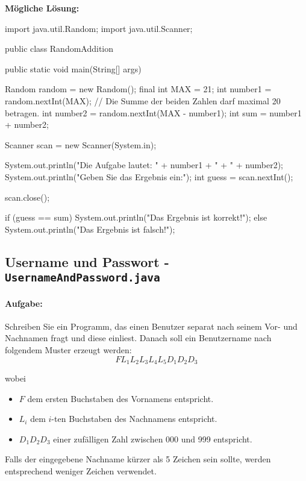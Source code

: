 \documentclass[a4paper,10pt, dvipsnames]{report}
\begin{document}
\textbf{Mögliche Lösung:}

\begin{javacodebox}
import java.util.Random;
import java.util.Scanner;

public class RandomAddition {
    public static void main(String[] args) {
        
        Random random = new Random();
        final int MAX = 21;
        int number1 = random.nextInt(MAX);
        // Die Summe der beiden Zahlen darf maximal 20 betragen.
        int number2 = random.nextInt(MAX - number1); 
        int sum = number1 + number2;

        Scanner scan = new Scanner(System.in);

        System.out.println("Die Aufgabe lautet: " + number1 + " + " + number2);
        System.out.println("Geben Sie das Ergebnis ein:");
        int guess = scan.nextInt();

        scan.close();

        if (guess == sum) {
            System.out.println("Das Ergebnis ist korrekt!");
        } else {
            System.out.println("Das Ergebnis ist falsch!");
        }
    }
}
\end{javacodebox}

\subsection{Username und Passwort - \texttt{UsernameAndPassword.java}}

\paragraph{Aufgabe:}
Schreiben Sie ein Programm, das einen Benutzer separat nach seinem Vor- und Nachnamen fragt und diese einliest. Danach soll ein Benutzername nach folgendem Muster erzeugt werden:
\[
F L_{1} L_{2} L_{3} L_{4} L_{5} D_{1} D_{2} D_{3}
\]

wobei

\begin{itemize}
    \item $F$ dem ersten Buchstaben des Vornamens entspricht.
    \item $L_{i}$ dem $i$-ten Buchstaben des Nachnamens entspricht.
    \item $D_{1}D_{2}D_{3}$ einer zufälligen Zahl zwischen 000 und 999 entspricht.
\end{itemize}

Falls der eingegebene Nachname kürzer als 5 Zeichen sein sollte, werden entsprechend weniger Zeichen verwendet.
\end{document}
